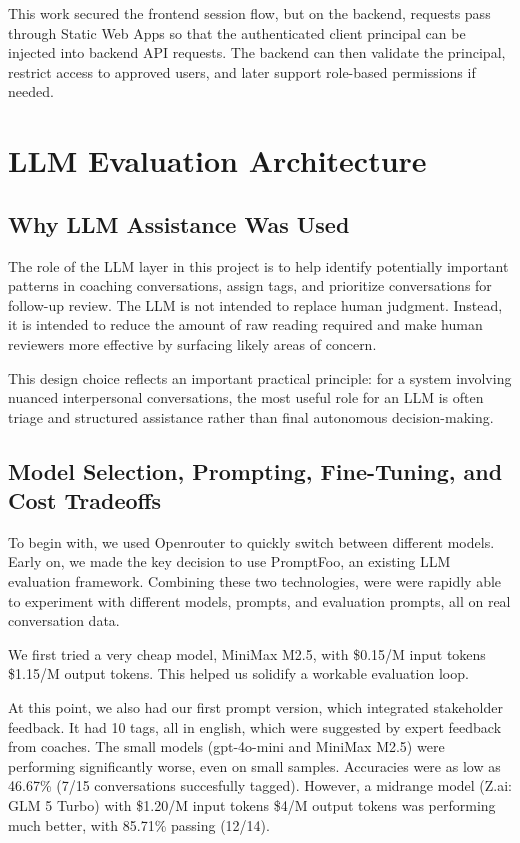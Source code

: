 \documentclass[12pt]{article}
\begin{document}
	This work secured the frontend session flow, but on the backend, requests pass through Static Web Apps so that the authenticated client principal can be injected into backend API requests. The backend can then validate the principal, restrict access to approved users, and later support role-based permissions if needed.
	
	\section{LLM Evaluation Architecture}
	
	\subsection{Why LLM Assistance Was Used}
	
	The role of the LLM layer in this project is to help identify potentially important patterns in coaching conversations, assign tags, and prioritize conversations for follow-up review. The LLM is not intended to replace human judgment. Instead, it is intended to reduce the amount of raw reading required and make human reviewers more effective by surfacing likely areas of concern.
	
	This design choice reflects an important practical principle: for a system involving nuanced interpersonal conversations, the most useful role for an LLM is often triage and structured assistance rather than final autonomous decision-making.
	
	\subsection{Model Selection, Prompting, Fine-Tuning, and Cost Tradeoffs}

    To begin with, we used Openrouter to quickly switch between different models. Early on, we made the key decision to use PromptFoo, an existing LLM evaluation framework. Combining these two technologies, were were rapidly able to experiment with different models, prompts, and evaluation prompts, all on real conversation data. 

    We first tried a very cheap model, MiniMax M2.5, with \$0.15/M input tokens \$1.15/M output tokens. 
    This helped us solidify a workable evaluation loop. 

    At this point, we also had our first prompt version, which integrated stakeholder feedback. 
    It had 10 tags, all in english, which were suggested by expert feedback from coaches. 
    The small models (gpt-4o-mini and MiniMax M2.5) were performing significantly worse, even on small samples. 
    Accuracies were as low as 46.67\% (7/15 conversations succesfully tagged). 
    However, a midrange model (Z.ai: GLM 5 Turbo) with \$1.20/M input tokens \$4/M output tokens was performing much better, with 85.71\% passing (12/14).
\end{document}
